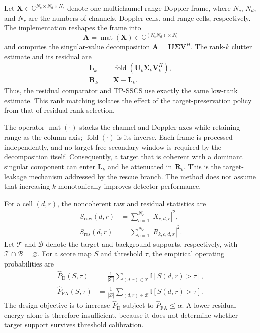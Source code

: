 \documentclass[journal]{IEEEtran}
\begin{document}
Let $\bm{X}\in\mathbb{C}^{N_c\times N_d\times N_r}$ denote one multichannel range-Doppler frame, where $N_c$, $N_d$, and $N_r$ are the numbers of channels, Doppler cells, and range cells, respectively. The implementation reshapes the frame into
\begin{equation}
    \bm{A}=\operatorname{mat}(\bm{X})
    \in\mathbb{C}^{(N_cN_d)\times N_r}
\end{equation}
and computes the singular-value decomposition $\bm{A}=\bm{U}\bm{\Sigma}\bm{V}^{H}$. The rank-$k$ clutter estimate and its residual are
\begin{align}
    \bm{L}_k & = \operatorname{fold}
    (\bm{U}_k\bm{\Sigma}_k\bm{V}_k^{H}), \\
    \bm{R}_k & = \bm{X}-\bm{L}_k .
\end{align}
Thus, the residual comparator and TP-SSCS use exactly the same low-rank estimate. This rank matching isolates the effect of the target-preservation policy from that of residual-rank selection.

The operator $\operatorname{mat}(\cdot)$ stacks the channel and Doppler axes while retaining range as the column axis; $\operatorname{fold}(\cdot)$ is its inverse. Each frame is processed independently, and no target-free secondary window is required by the decomposition itself. Consequently, a target that is coherent with a dominant singular component can enter $\bm{L}_k$ and be attenuated in $\bm{R}_k$. This is the target-leakage mechanism addressed by the rescue branch. The method does not assume that increasing $k$ monotonically improves detector performance.

For a cell $(d,r)$, the noncoherent raw and residual statistics are
\begin{align}
    S_{\mathrm{raw}}(d,r) & =
    \sum_{c=1}^{N_c}|X_{c,d,r}|^2, \\
    S_{\mathrm{res}}(d,r) & =
    \sum_{c=1}^{N_c}|R_{k,c,d,r}|^2.
\end{align}
Let $\mathcal{T}$ and $\mathcal{B}$ denote the target and background supports, respectively, with $\mathcal{T}\cap\mathcal{B}=\varnothing$. For a score map $S$ and threshold $\tau$, the empirical operating probabilities are
\begin{align}
    \widehat P_{\mathrm{D}}(S,\tau) & =
    \frac{1}{|\mathcal{T}|}\sum_{(d,r)\in\mathcal{T}}
    \mathbb I[S(d,r)>\tau], \\
    \widehat P_{\mathrm{FA}}(S,\tau) & =
    \frac{1}{|\mathcal{B}|}\sum_{(d,r)\in\mathcal{B}}
    \mathbb I[S(d,r)>\tau].
\end{align}
The design objective is to increase $\widehat P_{\mathrm{D}}$ subject to $\widehat P_{\mathrm{FA}}\leq\alpha$. A lower residual energy alone is therefore insufficient, because it does not determine whether target support survives threshold calibration.
\end{document}
